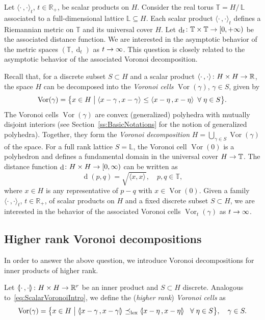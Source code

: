 \documentclass[AHL,Unicode,longabstracts]{cedram}
\newcommand{\innone}[2]{{\langle#2\rangle_{#1}}}
\newcommand{\llangle}{\mathopen{\langle\mkern -3.1mu\lvert}}
\newcommand{\rrangle}{\mathclose{\rvert\mkern -3.1mu\rangle}}
\newcommand{\highinn}[2]{{\llangle#2\rrangle_{#1}}}
\newcommand{\rquot}[2]{#1/\,#2}
\newcommand{\st}{\bigm|}
\DeclareMathOperator{\Vor}{Vor}
\DeclareMathOperator{\dist}{d}
\newcommand{\R}{\mathbb{R}}
\newcommand{\T}{\mathbb{T}}
\renewcommand{\L}{\mathbb{L}}
\newcommand{\lexeq}{\preceq_{\mathrm{lex}}}
\renewcommand*{\to}{\mathchoice{\longrightarrow}{\rightarrow}{\rightarrow}{\rightarrow}}
\let\oldforall\forall
\renewcommand*{\forall}{\mathrel{\oldforall}}
\begin{document}
Let $\innone{t}{\cdot \,, \cdot}$, $t \in \R_+$, be scalar products on $H$. Consider the real torus $\T= \rquot{H}{\L}$ associated to a full-dimensional lattice $\L\subseteq H$. Each scalar product $\innone{t}{\cdot \,, \cdot}$ defines a Riemannian metric on $\T$ and its universal cover $H$. Let $\dist_t \colon \T \times \T \to [0,+\infty)$ be the associated distance function. We are interested in the asymptotic behavior of the metric spaces $(\T, \dist_t)$ as $t \to \infty$. This question is closely related to the asymptotic behavior of the associated Voronoi decomposition.

Recall that, for a discrete subset $S \subset H$ and a scalar product $\innone{}{\cdot \,, \cdot} \colon H \times H \to \R$, the space $H$ can be decomposed into the \emph{Voronoi cells} $\Vor(\gamma)$, $\gamma \in S$, given by
\begin{equation}\label{eq:ScalarVoronoiIntro}
\Vor(\gamma) = \big \{x \in H \st \innone{}{x-\gamma \,, x-\gamma} \leq \innone{}{x-\eta \,, x-\eta} \, \forall \eta \in S \big \}.
\end{equation}
The Voronoi cells $\Vor(\gamma)$ are convex (generalized) polyhedra with mutually disjoint interiors (see Section~\ref{ss:BasicNotations} for the notion of generalized polyhedra). Together, they form the \emph{Voronoi decomposition} $H = \bigcup_{\gamma \in S} \Vor(\gamma)$ of the space. For a full rank lattice $S = \L$, the Voronoi cell $\Vor(0)$ is a polyhedron and defines a fundamental domain in the universal cover $H \to \T$. The distance function $\dist \colon H \times H \to [0, \infty)$ can be written as
\[
\dist(p,q) = \sqrt{\innone{}{x,x}}, \quad p,q \in \T,
\]
where $x \in H$ is any representative of $p-q$ with $x \in \Vor(0)$. Given a family $\innone{t}{\cdot \,, \cdot}$, $t \in \R_+$, of scalar products on $H$ and a fixed discrete subset $S \subset H$, we are interested in the behavior of the associated Voronoi cells $\Vor_t(\gamma)$ as $t \to \infty$.



\subsection{Higher rank Voronoi decompositions}

In order to answer the above question, we introduce Voronoi decompositions for inner products of higher rank.


Let $\highinn{}{\cdot\,, \cdot} \colon H \times H \to \R^r$ be an inner product and $S \subset H$ discrete. Analogous to~\eqref{eq:ScalarVoronoiIntro}, we define the (\emph{higher rank}) \emph{Voronoi cells} as
\begin{equation}\label{eq:HIgherRankVoronoiIntro}
\Vor(\gamma) = \bigl\{x \in H \st \highinn{}{x-\gamma \,, x-\gamma} \lexeq \highinn{}{x-\eta \,, x-\eta} \, \,\, \forall \eta \in S \bigr\}, \quad \gamma \in S.
\end{equation}
\end{document}

